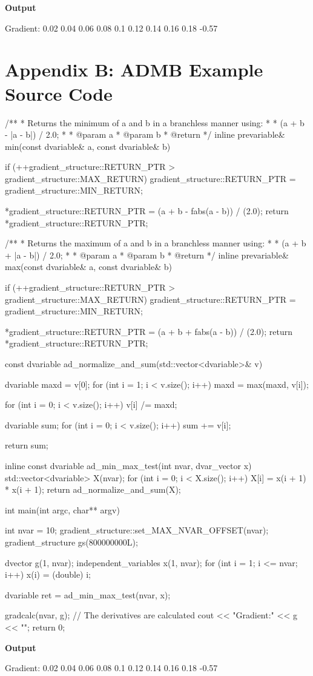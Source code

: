 \documentclass[oneside]{article}
\begin{document}
\textbf{Output}
\begin{myoutput}
Gradient:
0.02 0.04 0.06 0.08 0.1 0.12 0.14 0.16 0.18 -0.57
\end{myoutput}

\section{Appendix B: ADMB Example Source Code}

\begin{cppsource}
/**
 * Returns the minimum of a and b in a branchless manner using:
 *
 * (a + b - |a - b|) / 2.0;
 *
 * @param a
 * @param b
 * @return
 */
inline prevariable& min(const dvariable& a, const dvariable& b) {
    if (++gradient_structure::RETURN_PTR > gradient_structure::MAX_RETURN)
        gradient_structure::RETURN_PTR = gradient_structure::MIN_RETURN;

    *gradient_structure::RETURN_PTR = (a + b - fabs(a - b)) / (2.0);
    return *gradient_structure::RETURN_PTR;
}

/**
 * Returns the maximum of a and b in a branchless manner using:
 *
 * (a + b + |a - b|) / 2.0;
 *
 * @param a
 * @param b
 * @return
 */
inline prevariable& max(const dvariable& a, const dvariable& b) {
    if (++gradient_structure::RETURN_PTR > gradient_structure::MAX_RETURN)
        gradient_structure::RETURN_PTR = gradient_structure::MIN_RETURN;

    *gradient_structure::RETURN_PTR = (a + b + fabs(a - b)) / (2.0);
    return *gradient_structure::RETURN_PTR;
}

const dvariable ad_normalize_and_sum(std::vector<dvariable>& v) {
    dvariable maxd = v[0];
    for (int i = 1; i < v.size(); i++) {
        maxd = max(maxd, v[i]);
    }

    for (int i = 0; i < v.size(); i++) {
        v[i] /= maxd;
    }

    dvariable sum;
    for (int i = 0; i < v.size(); i++) {
        sum += v[i];
    }

    return sum;
}
\end{cppsource}

\begin{cppsource}
inline const dvariable ad_min_max_test(int nvar, dvar_vector x) {
    std::vector<dvariable> X(nvar);
    for (int i = 0; i < X.size(); i++) {
        X[i] = x(i + 1) * x(i + 1);
    }
    return ad_normalize_and_sum(X);
}

int main(int argc, char** argv) {

    int nvar = 10;
    gradient_structure::set_MAX_NVAR_OFFSET(nvar);
    gradient_structure gs(800000000L);

    dvector g(1, nvar);
    independent_variables x(1, nvar);
    for (int i = 1; i <= nvar; i++) {
        x(i) = (double) i;
    }

    dvariable ret = ad_min_max_test(nvar, x);

    gradcalc(nvar, g); // The derivatives are calculated
    cout << "Gradient:\n" << g << "\n";
    return 0;
}
\end{cppsource}

\textbf{Output}
\begin{myoutput}
Gradient:
0.02 0.04 0.06 0.08 0.1 0.12 0.14 0.16 0.18 -0.57
\end{myoutput}
\end{document}
